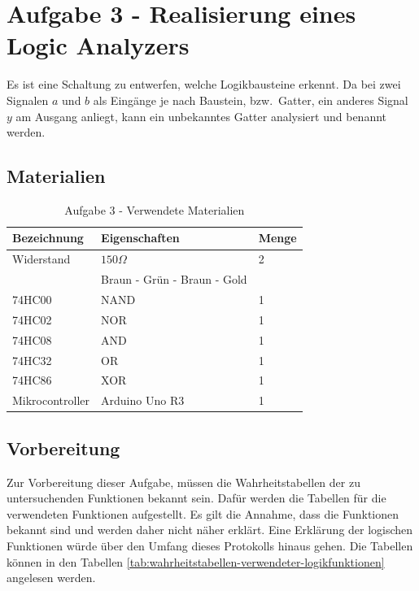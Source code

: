 \section{Aufgabe 3 - Realisierung eines Logic Analyzers}
\label{sec:aufgabe-3---realisierung-eines-logic-analyzers}

Es ist eine Schaltung zu entwerfen, welche Logikbausteine erkennt.
Da bei zwei Signalen $a$ und $b$ als Eingänge je nach Baustein, bzw.\ Gatter, ein anderes Signal $y$ am Ausgang anliegt, kann ein unbekanntes Gatter analysiert und benannt werden.


\subsection{Materialien}
\label{subsec:a3-materialien}


\begin{table}[h]
    \centering
    \caption{Aufgabe 3 - Verwendete Materialien}
    \label{tab:a3-materialien}
    \begin{tabular}{| l | l | l |}
        \hline
        Bezeichnung & Eigenschaften & Menge \\
        \hline
        Widerstand  & $150\Omega$   & 2     \\
        & Braun - Grün - Braun - Gold & \\
        74HC00 & NAND & 1 \\
        74HC02 & NOR  & 1\\
        74HC08 & AND & 1\\
        74HC32 & OR & 1\\
        74HC86 & XOR  & 1\\
        Mikrocontroller & Arduino Uno R3 & 1 \\
        \hline
    \end{tabular}
\end{table}


\subsection{Vorbereitung}
\label{subsec:a3-vorbereitung}

Zur Vorbereitung dieser Aufgabe, müssen die Wahrheitstabellen der zu untersuchenden Funktionen bekannt sein.
Dafür werden die Tabellen für die verwendeten Funktionen aufgestellt.
Es gilt die Annahme, dass die Funktionen bekannt sind und werden daher nicht näher erklärt.
Eine Erklärung der logischen Funktionen würde über den Umfang dieses Protokolls hinaus gehen.
Die Tabellen können in den Tabellen \ref{tab:wahrheitstabellen-verwendeter-logikfunktionen} angelesen werden.

